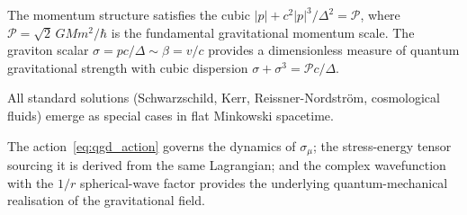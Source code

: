 \documentclass[11pt,a4paper]{article}
\theoremstyle{definition}
\theoremstyle{remark}
\begin{document}
	The momentum structure satisfies the cubic $|p|+c^2|p|^3/\Delta^2=\mathcal{P}$, where $\mathcal{P}=\sqrt{2}\,GMm^2/\hbar$ is the fundamental gravitational momentum scale.  The graviton scalar $\sigma=pc/\Delta\sim\beta=v/c$ provides a dimensionless measure of quantum gravitational strength with cubic dispersion $\sigma+\sigma^3=\mathcal{P}c/\Delta$.
	
	All standard solutions (Schwarzschild, Kerr, Reissner-Nordstr\"om, cosmological fluids) emerge as special cases in flat Minkowski spacetime.
	
	\bigskip
	The action~\eqref{eq:qgd_action} governs the dynamics of $\sigma_\mu$; the stress-energy tensor sourcing it is derived from the same Lagrangian; and the complex wavefunction with the $1/r$ spherical-wave factor provides the underlying quantum-mechanical realisation of the gravitational field.
\end{document}
